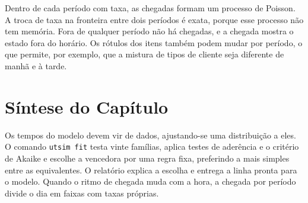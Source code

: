 Dentro de cada período com taxa, as chegadas formam um processo de Poisson. A troca de taxa na fronteira entre dois períodos é exata, porque esse processo não tem memória. Fora de qualquer período não há chegadas, e a chegada mostra o estado fora do horário. Os rótulos dos itens também podem mudar por período, o que permite, por exemplo, que a mistura de tipos de cliente seja diferente de manhã e à tarde.

\section{Síntese do Capítulo}

\begin{sintese}
Os tempos do modelo devem vir de dados, ajustando-se uma distribuição a eles. O comando \texttt{utsim fit} testa vinte famílias, aplica testes de aderência e o critério de Akaike e escolhe a vencedora por uma regra fixa, preferindo a mais simples entre as equivalentes. O relatório explica a escolha e entrega a linha pronta para o modelo. Quando o ritmo de chegada muda com a hora, a chegada por período divide o dia em faixas com taxas próprias.
\end{sintese}
